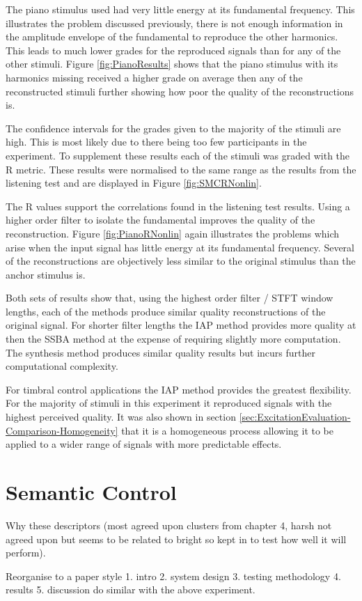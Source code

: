 		The piano stimulus used had very little energy at its fundamental frequency. This illustrates the problem
		discussed previously, there is not enough information in the amplitude envelope of the fundamental to
		reproduce the other harmonics. This leads to much lower grades for the reproduced signals than for any of
		the other stimuli. Figure \ref{fig:PianoResults} shows that the piano stimulus with its harmonics missing
		received a higher grade on average then any of the reconstructed stimuli further showing how poor the
		quality of the reconstructions is.

		The confidence intervals for the grades given to the majority of the stimuli are high. This is most likely
		due to there being too few participants in the experiment. To supplement these results each of the stimuli
		was graded with the R metric. These results were normalised to the same range as the results
		from the listening test and are displayed in Figure \ref{fig:SMCRNonlin}.

		The R values support the correlations found in the listening test results. Using a higher order
		filter to isolate the fundamental improves the quality of the reconstruction. Figure \ref{fig:PianoRNonlin}
		again illustrates the problems which arise when the input signal has little energy at its fundamental
		frequency. Several of the reconstructions are objectively less similar to the original stimulus than the
		anchor stimulus is.

		Both sets of results show that, using the highest order filter / STFT window lengths, each of the methods
		produce similar quality reconstructions of the original signal. For shorter filter lengths the IAP method
		provides more quality at then the SSBA method at the expense of requiring slightly more computation. The
		synthesis method produces similar quality results but incurs further computational complexity. 

		For timbral control applications the IAP method provides the greatest flexibility. For the majority of
		stimuli in this experiment it reproduced signals with the highest perceived quality. It was also shown in
		section \ref{sec:ExcitationEvaluation-Comparison-Homogeneity} that it is a homogeneous process allowing it
		to be applied to a wider range of signals with more predictable effects.

\section{Semantic Control}
\label{sec:PerceptualExperiments-SemanticControl}
	\note
	{
		Why these descriptors (most agreed upon clusters from chapter 4, harsh not agreed upon but seems to be
		related to bright so kept in to test how well it will perform).

		Reorganise to a paper style 1. intro 2. system design 3. testing methodology 4. results 5. discussion
		do similar with the above experiment.
	}


